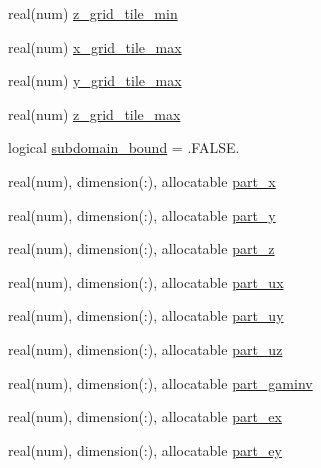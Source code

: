 \begin{DoxyCompactItemize}
\item 
real(num) \hyperlink{structparticle__tilemodule_1_1particle__tile_af4027ac6934ec98e941ce147cd914217}{z\+\_\+grid\+\_\+tile\+\_\+min}
\item 
real(num) \hyperlink{structparticle__tilemodule_1_1particle__tile_afa71688c8ff9a3c496122a637a222a18}{x\+\_\+grid\+\_\+tile\+\_\+max}
\item 
real(num) \hyperlink{structparticle__tilemodule_1_1particle__tile_a76acb784951c7e262aa708082ce0d3fa}{y\+\_\+grid\+\_\+tile\+\_\+max}
\item 
real(num) \hyperlink{structparticle__tilemodule_1_1particle__tile_a8536ab5672b968d25265efbb85fbcfbf}{z\+\_\+grid\+\_\+tile\+\_\+max}
\item 
logical \hyperlink{structparticle__tilemodule_1_1particle__tile_afa855d68563f759241ff1ea974031d84}{subdomain\+\_\+bound} = .F\+A\+L\+S\+E.
\item 
real(num), dimension(\+:), allocatable \hyperlink{structparticle__tilemodule_1_1particle__tile_a161fbd3d02d9b739c8f3608b2ed659f1}{part\+\_\+x}
\item 
real(num), dimension(\+:), allocatable \hyperlink{structparticle__tilemodule_1_1particle__tile_a4737a3e12255f57ce90d91c63a4e1f63}{part\+\_\+y}
\item 
real(num), dimension(\+:), allocatable \hyperlink{structparticle__tilemodule_1_1particle__tile_a8d89102d9a0d26ea7b4f201737bb6096}{part\+\_\+z}
\item 
real(num), dimension(\+:), allocatable \hyperlink{structparticle__tilemodule_1_1particle__tile_ae5bebe1676b35c5418336285a1dbbf39}{part\+\_\+ux}
\item 
real(num), dimension(\+:), allocatable \hyperlink{structparticle__tilemodule_1_1particle__tile_ab116cce90400a29ced69cdcc8cf7a8eb}{part\+\_\+uy}
\item 
real(num), dimension(\+:), allocatable \hyperlink{structparticle__tilemodule_1_1particle__tile_a7722a4567fe41c4f1753bc39f82608d4}{part\+\_\+uz}
\item 
real(num), dimension(\+:), allocatable \hyperlink{structparticle__tilemodule_1_1particle__tile_ace7d68b2ee792fed473a1020a8ba6f11}{part\+\_\+gaminv}
\item 
real(num), dimension(\+:), allocatable \hyperlink{structparticle__tilemodule_1_1particle__tile_a04d02a945821c7c9863f95bbef4585ec}{part\+\_\+ex}
\item 
real(num), dimension(\+:), allocatable \hyperlink{structparticle__tilemodule_1_1particle__tile_af8b4a1cc1be4fa07c6d831943982de0c}{part\+\_\+ey}

\end{DoxyCompactItemize}
